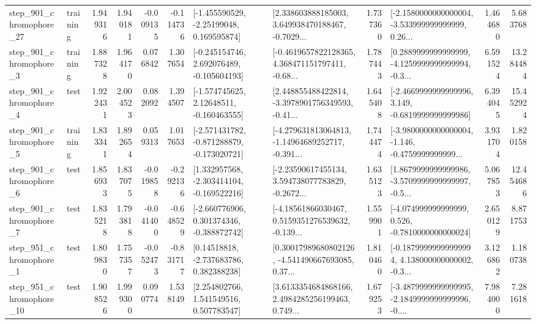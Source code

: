 \begin{tabular}{llrrrrllrlrr}
  step\_901\_chromophore\_27 &  training &      1.949316 &    1.940181 &     -0.009135 & -0.114736 &    [-1.455590529, -2.25199048, 0.169595874] &  [2.338603888185003, 3.649938470188467, -0.7029... &       1.737360 &  [-2.1580000000000004, -3.533999999999999, 0.26... &            1.464680 &          5.683768 \\
   step\_901\_chromophore\_3 &  training &      1.887328 &    1.964170 &      0.076842 &  1.307654 &   [-0.245154746, 2.692076489, -0.105604193] &  [-0.4619657822128365, 4.368471151797411, -0.68... &       1.787443 &  [0.2889999999999999, -4.1259999999999994, -0.3... &            6.591524 &         13.284484 \\
   step\_901\_chromophore\_4 &      test &      1.922431 &    2.004523 &      0.082092 &  1.394507 &    [-1.574745625, 2.12648511, -0.160463555] &  [2.448855488422814, -3.3978901756349593, -0.41... &       1.645408 &  [-2.4669999999999996, 3.149, -0.6819999999999986] &            6.394045 &         15.452924 \\
   step\_901\_chromophore\_5 &  training &      1.833341 &    1.892654 &      0.059313 &  1.017653 &  [-2.571431782, -0.871288879, -0.173020721] &  [-4.279631813064813, -1.14964689252717, -0.391... &       1.744474 &  [-3.9800000000000004, -1.146, -0.4759999999999... &            3.931704 &          1.820158 \\
   step\_901\_chromophore\_6 &      test &      1.856933 &    1.837075 &     -0.019858 & -0.292136 &   [1.332957568, -2.303414104, -0.169522216] &  [-2.23590617455134, 3.594738077783829, -0.2672... &       1.635123 &  [1.8679999999999986, -3.5709999999999997, -0.5... &            5.067853 &         12.454686 \\
   step\_901\_chromophore\_7 &      test &      1.835218 &    1.793818 &     -0.041400 & -0.648529 &   [-2.660776906, 0.301374346, -0.388872742] &  [-4.18561866030467, 0.5159351276539632, -0.139... &       1.559901 &   [-4.074999999999999, 0.526, -0.7810000000000024] &            2.650129 &          8.871753 \\
   step\_951\_chromophore\_1 &      test &      1.809830 &    1.757357 &     -0.052473 & -0.831717 &     [0.14518818, -2.737683786, 0.382388238] &  [0.30017989680802126, -4.541490667693085, 0.37... &       1.810460 &  [-0.18799999999999994, 4.138000000000002, -0.3... &            3.126862 &          1.180738 \\
  step\_951\_chromophore\_10 &      test &      1.908526 &    1.999300 &      0.090774 &  1.538149 &     [2.254802766, 1.541549516, 0.507783547] &  [3.6133354684868166, 2.4984285256199463, 0.749... &       1.679253 &  [-3.4879999999999995, -2.1849999999999996, -0.... &            7.984000 &          7.281618 \\

\end{tabular}
